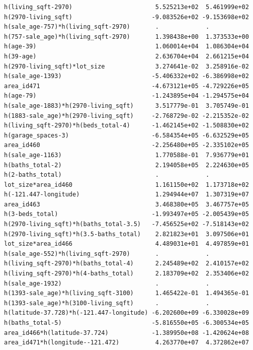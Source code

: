 \documentclass[
]{article}
\begin{document}
\begin{verbatim}
h(living_sqft-2970)                       5.525213e+02  5.461999e+02
h(2970-living_sqft)                      -9.083526e+02 -9.153698e+02
h(sale_age-757)*h(living_sqft-2970)       .             .           
h(757-sale_age)*h(living_sqft-2970)       1.398438e+00  1.373533e+00
h(age-39)                                 1.060014e+04  1.086304e+04
h(39-age)                                 2.636704e+04  2.661215e+04
h(2970-living_sqft)*lot_size              3.274641e-02  3.258916e-02
h(sale_age-1393)                         -5.406332e+02 -6.386998e+02
area_id471                               -4.673121e+05 -4.729226e+05
h(age-79)                                -1.243895e+04 -1.294575e+04
h(sale_age-1883)*h(2970-living_sqft)      3.517779e-01  3.705749e-01
h(1883-sale_age)*h(2970-living_sqft)     -2.768729e-02 -2.215352e-02
h(living_sqft-2970)*h(beds_total-4)      -1.462145e+02 -1.508830e+02
h(garage_spaces-3)                       -6.584354e+05 -6.632529e+05
area_id460                               -2.256480e+05 -2.335102e+05
h(sale_age-1163)                          1.770588e-01  7.936779e+01
h(baths_total-2)                          2.194058e+05  2.224630e+05
h(2-baths_total)                          .             .           
lot_size*area_id460                       1.161150e+02  1.173718e+02
h(-121.447-longitude)                     1.294944e+07  1.307319e+07
area_id463                                3.468380e+05  3.467757e+05
h(3-beds_total)                          -1.993497e+05 -2.005439e+05
h(2970-living_sqft)*h(baths_total-3.5)   -7.456525e+02 -7.518143e+02
h(2970-living_sqft)*h(3.5-baths_total)    2.821823e+01  3.097506e+01
lot_size*area_id466                       4.489031e+01  4.497859e+01
h(sale_age-552)*h(living_sqft-2970)       .             .           
h(living_sqft-2970)*h(baths_total-4)      2.245489e+02  2.410157e+02
h(living_sqft-2970)*h(4-baths_total)      2.183709e+02  2.353406e+02
h(sale_age-1932)                          .             .           
h(1393-sale_age)*h(living_sqft-3100)      1.465422e-01  1.494365e-01
h(1393-sale_age)*h(3100-living_sqft)      .             .           
h(latitude-37.728)*h(-121.447-longitude) -6.202600e+09 -6.330028e+09
h(baths_total-5)                         -5.816550e+05 -6.300534e+05
area_id466*h(latitude-37.724)            -1.389950e+08 -1.420624e+08
area_id471*h(longitude--121.472)          4.263770e+07  4.372862e+07
                                                                    

\end{verbatim}
\end{document}
